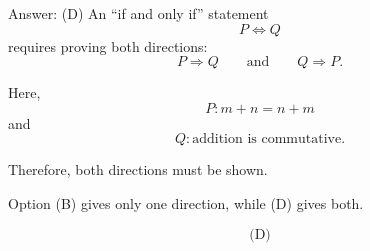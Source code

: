 \documentclass[aspectratio=169,11pt]{beamer}
\begin{document}
\begin{frame}

\begin{block}{Answer: (D)}
An ``if and only if'' statement
$$
P\iff Q
$$
requires proving both directions:
$$
P\Rightarrow Q
\qquad\text{and}\qquad
Q\Rightarrow P.
$$

Here,
$$
P:m+n=n+m
$$
and
$$
Q:\text{addition is commutative}.
$$

Therefore, both directions must be shown.

Option (B) gives only one direction, while (D) gives both.

$$
\boxed{\text{(D)}}
$$
\end{block}

\end{frame}
\end{document}
